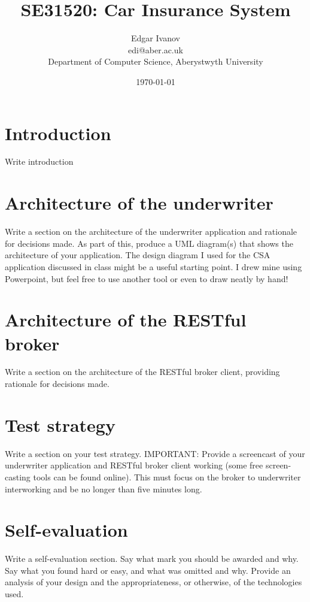 \documentclass[10pt,a4paper,headinclude=true,twoside]{report}
\begin{document}
\title{SE31520: Car Insurance System}
\author{Edgar Ivanov\\ edi@aber.ac.uk \\ Department of Computer Science, Aberystwyth University}
\date{\today}
\maketitle

\newpage
\thispagestyle{empty}
\mbox{}

\tableofcontents

\chapter{Introduction}
Write introduction

\chapter{Architecture of the underwriter}
Write a section on the architecture of the underwriter application and
rationale for decisions made. As part of this, produce a UML
diagram(s) that shows the architecture of your application. The design
diagram I used for the CSA application discussed in class might be a
useful starting point. I drew mine using Powerpoint, but feel free to use
another tool or even to draw neatly by hand!
\chapter{Architecture of the RESTful broker}
Write a section on the architecture of the RESTful broker client,
providing rationale for decisions made.
\chapter{Test strategy}
Write a section on your test strategy. IMPORTANT: Provide a
screencast of your underwriter application and RESTful broker client
working (some free screen-casting tools can be found online). This
must focus on the broker to underwriter interworking and be no longer
than five minutes long.
\chapter{Self-evaluation}
Write a self-evaluation section. Say what mark you should be awarded
and why. Say what you found hard or easy, and what was omitted and
why. Provide an analysis of your design and the appropriateness, or
otherwise, of the technologies used.



\end{document}
